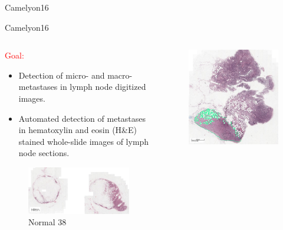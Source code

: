 \documentclass{beamer}
\begin{document}
\begin{frame}[noframenumbering]{Camelyon16}
\end{frame}

\begin{frame}[noframenumbering]{Camelyon16}

\begin{columns}[T] %
\begin{column}{.50\textwidth}
\begin{small}
\textcolor{red}{Goal:}
\begin{itemize}
\item Detection of micro- and macro-metastases in lymph node digitized images.
\item Automated detection of metastases in hematoxylin and eosin (H\&E) stained whole-slide images of lymph node sections.
\end{itemize}
\end{small}
\begin{figure}[!ht]
\centering
\includegraphics[width=\textwidth]{Normal_38.png}
\caption{Normal 38}
\label{normal_38}
\end{figure}
\end{column}%
\hfill%
\begin{column}{.50\textwidth}
\begin{figure}[!ht]
\centering
\includegraphics[width=\textwidth]{Tumor_34.png}

\end{figure}
\end{column}
\end{columns}
\end{frame}
\end{document}

